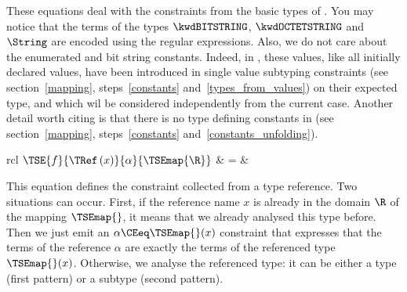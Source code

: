These equations deal with the constraints from the basic types of
\ASN. You may notice that the terms of the types $\kwdBITSTRING$,
$\kwdOCTETSTRING$ and $\String$ are encoded using the regular
expressions. Also, we do not care about the enumerated and bit
string constants. Indeed, in \core, these values, like all
initially declared values, have been introduced in single value
subtyping constraints (see section~\ref{mapping},
steps~\ref{constants} and~\ref{types_from_values}) on their expected
type, and which wil be considered independently from the current
case. Another detail worth citing is that there is no \kwdINTEGER{}
type defining constants in \core (see section~\ref{mapping},
steps~\ref{constants} and~\ref{constants_unfolding}).

\begin{center}
\begin{tabular}{rcl}
$\TSE{f}{\TRef \, (x)}{\alpha}{\TSEmap{\R}}$
  & \hspace*{-4mm} = & \\
\end{tabular}
\end{center}

This equation defines the constraint collected from a type
reference. Two situations can occur. First, if the reference name $x$
is already in the domain $\R$ of the mapping $\TSEmap{}$, it means
that we already analysed this type before. Then we just emit
an $\alpha \CEeq \TSEmap{}(x)$ constraint that expresses that the
terms of the reference $\alpha$ are exactly the terms of the
referenced type $\TSEmap{}(x)$. Otherwise, we analyse the referenced
type: it can be either a type (first pattern) or a subtype (second
pattern).

